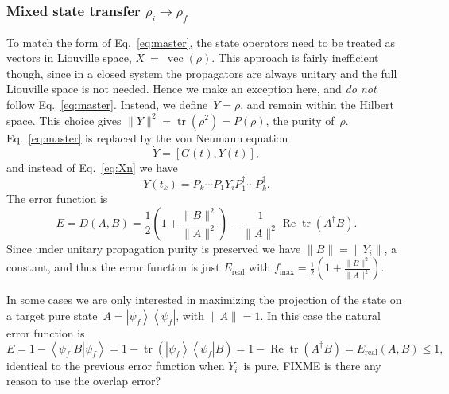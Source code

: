 \documentclass[aps, pra, a4paper, longbibliography, superscriptaddress]{revtex4-1}
\newcommand{\be}{\begin{equation}}
\newcommand{\ee}{\end{equation}}
\newcommand{\ket}[1]{\left| #1 \right \rangle}
\newcommand{\bra}[1]{\left \langle #1 \right|}
\newcommand{\braket}[2]{\left \langle #1 | #2 \right \rangle}
\newcommand{\ketbra}[2]{\left| #1 \right \rangle \left \langle #2 \right|}
\newcommand{\comm}[2]{\left[ #1, #2 \right]}
\DeclareMathOperator{\tr}{tr}
\DeclareMathOperator{\re}{Re}
\DeclareMathOperator{\cvec}{vec}
\begin{document}
\subsubsection{Mixed state transfer $\rho_i \to \rho_f$}
\label{sec:closed-mixed}

To match the form of Eq.~\eqref{eq:master},
the state operators need to be treated as vectors in Liouville space,
$X~=~\cvec(\rho)$.
This approach is fairly inefficient though, since in a closed system the
propagators are always unitary and the full Liouville space is not
needed. Hence we make an exception here, and \emph{do not} follow Eq.~\eqref{eq:master}.
Instead, we define~$Y = \rho$, and remain within the Hilbert space.
This choice gives $\|Y\|^2 = \tr(\rho^2) = P(\rho)$, the purity of~$\rho$.
Eq.~\eqref{eq:master} is replaced by the von Neumann equation
\be
\label{eq:vonneumann}
\dot{Y} = \comm{G(t)}{Y(t)},
\ee
and instead of Eq.~\eqref{eq:Xn} we have
\be
Y(t_k) = P_k \cdots P_1 Y_i P_1^\dagger \cdots P_k^\dagger.
\ee
The error function is
\be
E
= D(A, B)
= \frac{1}{2}\left(1 +\frac{\|B\|^2}{\|A\|^2}\right) -\frac{1}{\|A\|^2} \re \tr(A^\dagger B).
\ee
Since under unitary propagation purity is preserved we have
$\|B\| = \|Y_i\|$, a constant, and thus the error function is just $E_\text{real}$ with
$f_{\text{max}} = \frac{1}{2}\left(1 +\frac{\|B\|^2}{\|A\|^2}\right)$.

\begin{comment}
Another option would be to use the $\cvec$-representation $X = \cvec(\rho)$.
$\|X\|^2$~is equivalent to the purity of the state:
\be
\|X\|^2
= \|\cvec(\rho)\|^2
= \|\rho\|^2
= \tr(\rho^2)
= P(\rho).
\ee
Unitary propagation conserves purity, hence $\|B\|$~is constant and we may
simply maximize the fidelity
\be
f(A, B)
= \frac{1}{\|A\|} (\re) \tr(A^\dagger B)
\ee
Furthermore, the fidelity is strictly nonnegative since the
state operators are positive:
\be
0 \le f(A, B) \le \sqrt{\frac{P(\rho_i)}{P(\rho_f)}}.
\ee
If either $\rho_f$ or $\rho_i$ is pure,
$\rho = \ketbra{\psi}{\psi}$,
we have $\|\rho\|^2 = \braket{\psi}{\psi}^2 = 1$, and
the diagram simplifies by splitting up.
\end{comment}

In some cases we are only interested in maximizing the projection of
the state on a target pure state~$A = \ketbra{\psi_f}{\psi_f}$,
with $\|A\| = 1$. In this case the natural error function is
\be
E
= 1 -\bra{\psi_f} B \ket{\psi_f}
= 1 -\tr\left(\ketbra{\psi_f}{\psi_f} B \right)
= 1 -\re \tr\left(A^\dagger B\right)
= E_\text{real}(A, B) \le 1,
\ee
identical to the previous error function when $Y_i$~is pure.
FIXME is there any reason to use the overlap error?
\end{document}
